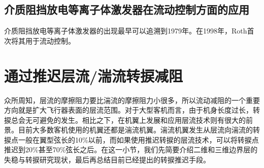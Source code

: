 \subsection{介质阻挡放电等离子体激发器在流动控制方面的应用}
介质阻挡放电等离子体激发器的出现最早可以追溯到1979年\cite{Masuda1979}。在1998年，Roth首次将其用于流动控制\cite{Roth1998}。
\section{通过推迟层流/湍流转捩减阻}
\label{sec:first}
众所周知，层流的摩擦阻力要比湍流的摩擦阻力小很多，所以流动减阻的一个重要方向就是扩大飞行器表面的层流范围。对于大型客机而言，由于机身长度过长，转捩总会无可避免的发生。相比之下，在机翼上发展和应用层流技术则有很大的前景。目前大多数客机使用的机翼还都是湍流机翼。湍流机翼发生从层流向湍流的转捩点一般在翼型弦长的10\%以前，而如果使用推迟转捩的层流技术，可以将转捩点推迟到20\%甚至70\%弦长之后。在这一小节，我们先简要介绍二维和三维边界层的失稳与转捩研究现状，最后再总结目前已经提出的转捩推迟手段。


